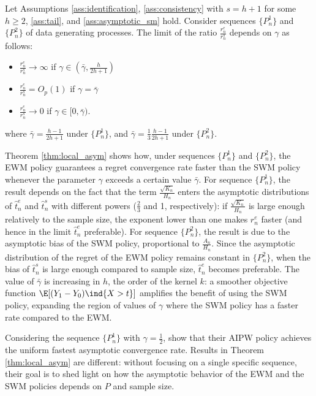 {\begin{thm} \label{thm:local_asym}
    Let Assumptions \ref{ass:identification}, \ref{ass:consistency} with $s=h + 1$ for some $h\geq 2$, \ref{ass:tail}, and \ref{ass:asymptotic_sm} hold.
    Consider  sequences $\{P^1_n\}$ and $\{P^2_n\}$ of data generating processes. The limit of the ratio $\frac{r_n^e}{r_n^s}$ depends on $\gamma$ as follows:
    \begin{itemize}
    \item $\frac{r_n^e}{r_n^s} \to \infty$ if $\gamma \in (\bar{\gamma},\frac{h}{2h + 1})$
    \item $\frac{r_n^e}{r_n^s} = O_p(1)$ if $\gamma = \bar{\gamma} $
    \item $\frac{r_n^e}{r_n^s} \to 0$ if $\gamma \in [0,\bar{\gamma})$.
    \end{itemize}
    where $\bar{\gamma} = \frac{h-1}{2h + 1}$ under $\{P^1_n\}$, and $\bar{\gamma} = \frac{1}{3}\frac{h-1}{2h + 1}$ under $\{P^2_n\}$.
\end{thm}

Theorem \ref{thm:local_asym} shows how, under sequences $\{P^1_n\}$ and $\{P^2_n\}$, the EWM policy guarantees a regret convergence rate faster than the SWM policy whenever the parameter $\gamma$ exceeds a certain value $\bar{\gamma}$. For sequence $\{P^1_n\}$, the result depends on the fact that the term $\frac{\sqrt{K_n}}{H_n}$ enters the asymptotic distributions of $\hat{t}^e_n$ and $\hat{t}^s_n$ with different powers ($\frac{2}{3}$ and 1, respectively): if $\frac{\sqrt{K_n}}{H_n}$ is large enough relatively to the sample size, the exponent lower than one makes $r^e_n$ faster (and hence in the limit $\hat{t}^e_n$ preferable). For sequence $\{P^2_n\}$, the result is due to the asymptotic bias of the SWM policy, proportional to $\frac{A_n}{H_n}$. Since the asymptotic distribution of the regret of the EWM policy remains constant in $\{P^2_n\}$, when the bias of $\hat{t}^s_n$ is large enough compared to sample size, $\hat{t}^e_n$ becomes preferable. The value of $\bar{\gamma}$ is increasing in $h$, the order of the kernel $k$: a smoother objective function $\E[(Y_1-Y_0) \ind\{X> t\}]$ amplifies the benefit of using the SWM policy, expanding the region of values of $\gamma$ where the SWM policy has a faster rate compared to the EWM.

Considering the sequence $\{P^1_n\}$ with $\gamma = \frac{1}{2}$,
\cite{athey2021policy} show that their AIPW policy achieves the uniform fastest asymptotic convergence rate. Results in Theorem \ref{thm:local_asym} are different: without focusing on a single specific sequence, their goal is to shed light on how the asymptotic behavior of the EWM and the SWM policies depends on $P$ and sample size.

}
